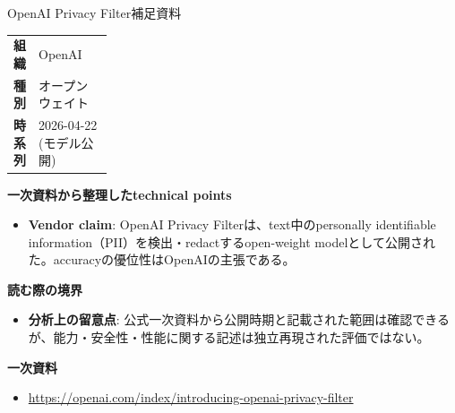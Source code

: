 \begin{technicalnote}{OpenAI Privacy Filter}{補足資料}
\begingroup
\begin{tabularx}{\linewidth}{@{}>{\bfseries}p{0.22\linewidth}X@{}}
組織 & OpenAI \\
種別 & オープンウェイト \\
時系列 & 2026-04-22 (モデル公開) \\
\end{tabularx}
\smallskip
{\bfseries 一次資料から整理したtechnical points}
\begin{itemize}[leftmargin=1.5em,itemsep=0.35em]
\item \textbf{Vendor claim}: OpenAI Privacy Filterは、text中のpersonally identifiable information（PII）を検出・redactするopen-weight modelとして公開された。accuracyの優位性はOpenAIの主張である。
\end{itemize}
{\bfseries 読む際の境界}
\begin{itemize}[leftmargin=1.5em,itemsep=0.35em]
\item \textbf{分析上の留意点}: 公式一次資料から公開時期と記載された範囲は確認できるが、能力・安全性・性能に関する記述は独立再現された評価ではない。
\end{itemize}
\begin{samepage}
{\bfseries 一次資料}
\begingroup\sloppy
\begin{itemize}[leftmargin=1.5em,itemsep=0.25em]
\item {\scriptsize\url{https://openai.com/index/introducing-openai-privacy-filter}}
\end{itemize}
\endgroup
\end{samepage}
\endgroup
\end{technicalnote}
\medskip


